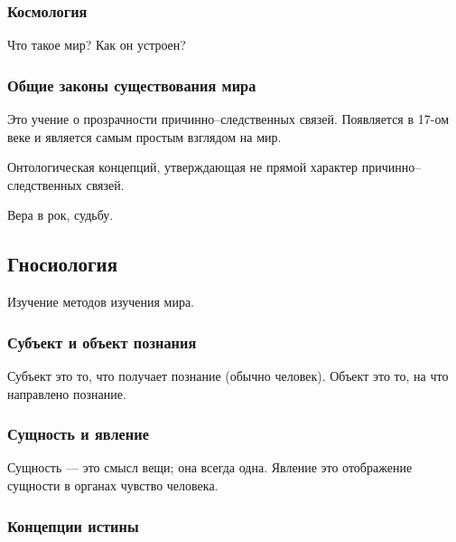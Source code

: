 \hrulefill

\subsubsection{Космология}

Что такое мир? Как он устроен?

\subsubsection{Общие законы существования мира}

\begin{definition}[Детерминизм]
	Это учение о прозрачности причинно--следственных связей. Появляется в 17-ом
	веке и является самым простым взглядом на мир.
\end{definition}

\begin{definition}[Индетерминизм]
	Онтологическая концепций, утверждающая не прямой характер
	причинно--следственных связей.
\end{definition}

\begin{definition}[Фатализм]
	Вера в рок, судьбу.
\end{definition}

\subsection{Гносиология}

\begin{definition}[Гносиология]
	Изучение методов изучения мира.
\end{definition}

\subsubsection{Субъект и объект познания}

Субъект это то, что получает познание (обычно человек). Объект это то, на что
направлено познание.

\subsubsection{Сущность и явление}

Сущность --- это смысл вещи; она всегда одна. Явление это отображение сущности в
органах чувство человека.

\subsubsection{Концепции истины}

